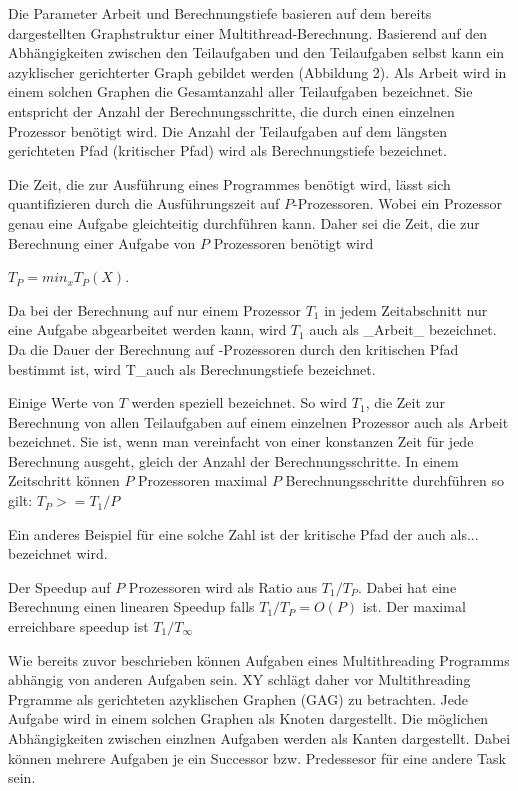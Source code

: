 Die Parameter Arbeit und Berechnungstiefe basieren auf dem bereits dargestellten Graphstruktur einer Multithread-Berechnung. Basierend auf den Abhängigkeiten zwischen den Teilaufgaben und den Teilaufgaben selbst kann ein azyklischer gerichterter Graph gebildet werden (Abbildung 2). Als Arbeit wird in einem solchen Graphen die Gesamtanzahl aller Teilaufgaben bezeichnet. Sie entspricht der Anzahl der Berechnungsschritte, die durch einen einzelnen Prozessor benötigt wird. Die Anzahl der Teilaufgaben auf dem längsten gerichteten Pfad (kritischer Pfad) wird als Berechnungstiefe bezeichnet.

Die Zeit, die zur Ausführung eines Programmes benötigt wird, lässt sich quantifizieren durch die Ausführungszeit auf $P$-Prozessoren. Wobei ein Prozessor genau eine Aufgabe gleichteitig durchführen kann. Daher sei die Zeit, die zur Berechnung einer Aufgabe von $P$ Prozessoren benötigt wird

$T_P = min_x T_P(X)$.

Da bei der Berechnung auf nur einem Prozessor $T_1$ in jedem Zeitabschnitt nur eine Aufgabe abgearbeitet werden kann, wird $T_1$ auch als _Arbeit_ bezeichnet. Da die Dauer der Berechnung auf \infty-Prozessoren durch den kritischen Pfad bestimmt ist, wird T_\infty auch als Berechnungstiefe bezeichnet.

Einige Werte von $T$ werden speziell bezeichnet. So wird $T_1$, die Zeit zur Berechnung von allen Teilaufgaben auf einem einzelnen Prozessor auch als Arbeit bezeichnet. Sie ist, wenn man vereinfacht von einer konstanzen Zeit für jede Berechnung ausgeht, gleich der Anzahl der Berechnungsschritte. In einem Zeitschritt können $P$ Prozessoren maximal $P$ Berechnungsschritte durchführen so gilt: $T_P >= T_1/P$


Ein anderes Beispiel für eine solche Zahl ist der kritische Pfad der auch als... bezeichnet wird.


Der Speedup auf $P$ Prozessoren wird als Ratio aus $T_1/T_P$. Dabei hat eine Berechnung einen linearen Speedup falls $T_1/T_P = O(P)$ ist. Der maximal erreichbare speedup ist $T_1/T_\infty$




Wie bereits zuvor beschrieben können Aufgaben eines Multithreading Programms abhängig von anderen Aufgaben sein. XY schlägt daher vor Multithreading Prgramme als gerichteten azyklischen Graphen (GAG) zu betrachten. Jede Aufgabe wird in einem solchen Graphen als Knoten dargestellt. Die möglichen Abhängigkeiten zwischen einzlnen Aufgaben werden als Kanten dargestellt. Dabei können mehrere Aufgaben je ein Successor bzw. Predessesor für eine andere Task sein.

